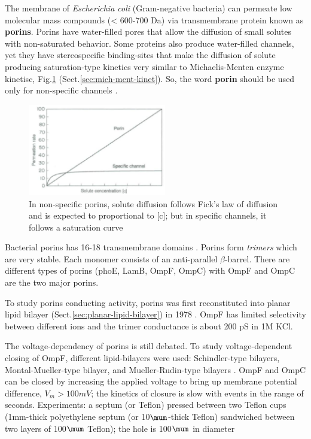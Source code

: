 The membrane of {\it Escherichia coli} (Gram-negative bacteria) can permeate low
molecular mass compounds (< 600-700 Da) via transmembrane protein known as {\bf
porins}. Porins have water-filled pores that allow the diffusion of small
solutes with non-saturated behavior. Some proteins also produce water-filled
channels, yet they have stereospecific binding-sites that make the diffusion of
solute producing saturation-type kinetics very similar to Michaelis-Menten
enzyme kinetisc, Fig.\ref{fig:permeation_rate} (Sect.\ref{sec:mich-ment-kinet}).
So, the word {\bf porin} should be used only for non-specific channels
\citep{nikaido1992}.

\begin{figure}[hbt]
  \centerline{\includegraphics[height=4cm,
    angle=0]{./images/permeation_rate.eps}}
  \caption{In non-specific porins, solute diffusion follows Fick's law of
  diffusion and is expected to proportional to [c]; but in specific channels, it
  follows a saturation curve}
\label{fig:permeation_rate}
\end{figure}

Bacterial porins has 16-18 transmembrane domains \citep{nikaido1992}. Porins
form {\it trimers} which are very stable.
Each monomer consists of an anti-parallel $\beta$-barrel. There are different
types of porins (phoE, LamB, OmpF, OmpC) with OmpF and OmpC are the two major
porins.

To study porins conducting activity, porins was first reconstituted into planar
lipid bilayer (Sect.\ref{sec:planar-lipid-bilayer}) in 1978 \citep{benz1978,
schindler1978}. OmpF has limited selectivity between different ions and the trimer
conductance is about 200 pS in 1M KCl.

The voltage-dependency of porins is still debated. To study voltage-dependent
closing of OmpF, different lipid-bilayers were used: Schindler-type bilayers,
Montal-Mueller-type bilayer, and Mueller-Rudin-type bilayers \citep{lakey1989}.
OmpF and OmpC can be closed by increasing the applied voltage to bring up
membrane potential difference, $V_m >100mV$; the kinetics of closure is slow
with events in the range of seconds. Experiments: a septum (or Teflon) pressed
between two Teflon cups (1mm-thick polyethylene septum (or 10$\mum$-thick
Teflon) sandwiched between two layers of 100$\mum$ Teflon); the hole is
100$\mum$ in diameter \citep{berrier1992}

